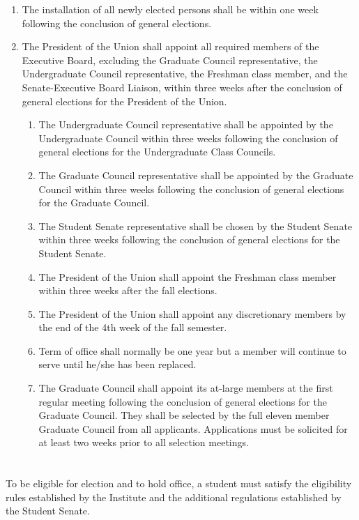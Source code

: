 \documentclass{uniondoc}
\begin{document}
\begin{enumerate}
\item The installation of all newly elected persons shall be within one week following the conclusion of general elections.
\item The President of the Union shall appoint all required members of the Executive Board, excluding the Graduate Council representative, the Undergraduate Council representative, the Freshman class member, and the Senate-Executive Board Liaison, within three weeks after the conclusion of general elections for the President of the Union.
  \begin{enumerate}
  \item The Undergraduate Council representative shall be appointed by the Undergraduate Council within three weeks following the conclusion of general elections for the Undergraduate Class Councils.
  \item The Graduate Council representative shall be appointed by the Graduate Council within three weeks following the conclusion of general elections for the Graduate Council.
  \item The Student Senate representative shall be chosen by the Student Senate within three weeks following the conclusion of general elections for the Student Senate.
  \item The President of the Union shall appoint the Freshman class member within three weeks after the fall elections.
  \item The President of the Union shall appoint any discretionary members by the end of the 4th week of the fall semester.
  \item Term of office shall normally be one year but a member will continue to serve until he/she has been replaced.
  \item The Graduate Council shall appoint its at-large members at the first regular meeting following the conclusion of general elections for the Graduate Council. They shall be selected by the full eleven member Graduate Council from all applicants. Applications must be solicited for at least two weeks prior to all selection meetings.
  \end{enumerate}
\end{enumerate}

\section{}

To be eligible for election and to hold office, a student must satisfy the eligibility rules established by the Institute and the additional regulations established by the Student Senate.
\end{document}
